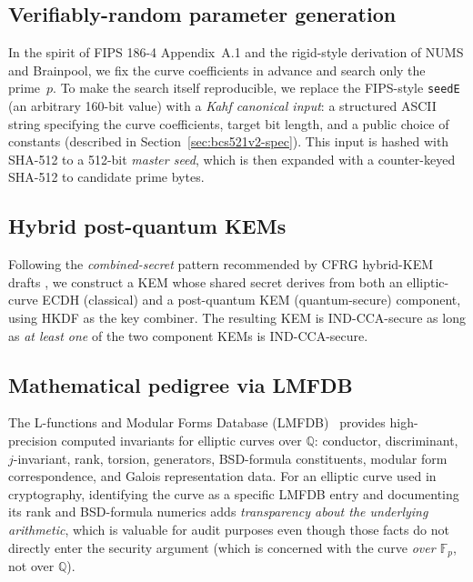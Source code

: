 \documentclass[11pt,a4paper]{article}
\theoremstyle{plain}
\theoremstyle{definition}
\newcommand{\Q}{\mathbb{Q}}
\newcommand{\F}{\mathbb{F}}
\begin{document}
\subsection{Verifiably-random parameter generation}

In the spirit of FIPS 186-4 Appendix~A.1 and the rigid-style derivation
of NUMS and Brainpool, we fix the curve coefficients in advance and
search only the prime~$p$. To make the search itself reproducible,
we replace the FIPS-style \texttt{seedE} (an arbitrary 160-bit value)
with a \emph{Kahf canonical input}: a structured ASCII string
specifying the curve coefficients, target bit length, and a public
choice of constants (described in Section~\ref{sec:bcs521v2-spec}).
This input is hashed with SHA-512 to a 512-bit \emph{master seed},
which is then expanded with a counter-keyed SHA-512 to candidate
prime bytes.

\subsection{Hybrid post-quantum KEMs}

Following the \emph{combined-secret} pattern recommended by CFRG
hybrid-KEM drafts \cite{IETF-Hybrid-KEM-Draft, NISTPQCFAQ}, we
construct a KEM whose shared secret derives from both an
elliptic-curve ECDH (classical) and a post-quantum KEM
(quantum-secure) component, using HKDF \cite{HKDF} as the key
combiner. The resulting KEM is IND-CCA-secure as long as
\emph{at least one} of the two component KEMs is IND-CCA-secure.

\subsection{Mathematical pedigree via LMFDB}

The L-functions and Modular Forms Database (LMFDB)~\cite{LMFDB}
provides high-precision computed invariants for elliptic curves
over $\Q$: conductor, discriminant, $j$-invariant, rank, torsion,
generators, BSD-formula constituents, modular form correspondence,
and Galois representation data. For an elliptic curve used in
cryptography, identifying the curve as a specific LMFDB entry and
documenting its rank and BSD-formula numerics adds
\emph{transparency about the underlying arithmetic}, which is
valuable for audit purposes even though those facts do not directly
enter the security argument (which is concerned with the curve
\emph{over $\F_p$}, not over $\Q$).

\end{document}
